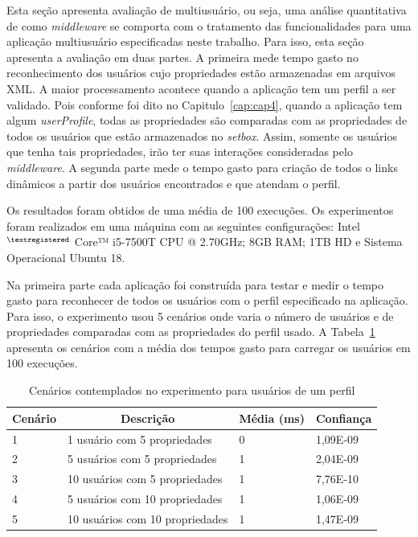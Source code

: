 Esta seção apresenta avaliação de multiusuário, ou seja, uma análise quantitativa de como \textit{middleware} se comporta com o tratamento das funcionalidades para uma aplicação multiusuário especificadas neste trabalho. Para isso, esta seção apresenta a avaliação em duas partes. A primeira mede tempo gasto no reconhecimento dos usuários cujo propriedades estão armazenadas em arquivos XML. A maior processamento acontece quando a aplicação tem um perfil a ser validado. Pois conforme foi dito no Capitulo~\ref{cap:cap4}, quando a aplicação tem algum \textit{userProfile}, todas as propriedades são comparadas com as propriedades de todos os usuários que estão armazenados no \textit{setbox}. Assim, somente os usuários que tenha tais propriedades, irão ter suas interações consideradas pelo \textit{middleware}. A segunda parte mede o tempo gasto para criação de todos o links dinâmicos a partir dos usuários encontrados e que atendam o perfil.

Os resultados foram obtidos de uma média de 100 execuções. Os experimentos foram realizados em uma máquina com as seguintes configurações: Intel$^{\tiny{\textregistered}}$ Core™ i5-7500T CPU @ 2.70GHz; 8GB RAM; 1TB HD e Sistema Operacional Ubuntu 18.

Na primeira parte cada aplicação foi construída para testar e medir o tempo gasto para reconhecer de todos os usuários com o perfil especificado na aplicação. Para isso, o experimento usou 5 cenários onde varia o número de usuários e de propriedades comparadas com as propriedades do perfil usado. A Tabela~\ref{tab:expUserPerfil} apresenta os cenários com a média dos tempos gasto para carregar os usuários em 100 execuções.

\begin{table}[h]
\centering
{
  \renewcommand\arraystretch{1.25}
  \begin{tabular}{|p{}|p{6cm}|p{}|p{2cm}|} \hline
   \multicolumn{1}{|c|}{Cenário} & \multicolumn{1}{|c|}{Descrição} & \multicolumn{1}{c|}{Média (ms)} & \multicolumn{1}{c|}{Confiança} \\\hline
    1 & 1 usuário com 5 propriedades &  0  & 1,09E-09    \\\hline
    2 & 5 usuários com 5 propriedades &  1  & 2,04E-09   \\\hline
    3 & 10 usuários com 5 propriedades &  1  & 7,76E-10  \\\hline
    4 & 5 usuários com 10 propriedades &  1  & 1,06E-09  \\\hline
    5 & 10 usuários com 10 propriedades &  1  & 1,47E-09 \\\hline
   \end{tabular}
\caption{Cenários contemplados no experimento para usuários de um perfil}
\label{tab:expUserPerfil}
}
\end{table}

